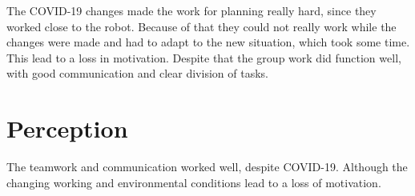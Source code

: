 \documentclass[main.tex]{subfiles}
\begin{document}
The COVID-19 changes made the work for planning really hard, since they worked close to the robot. Because of that they could not really work while the changes were made and had to adapt to the new situation, which took some time.
This lead to a loss in motivation. Despite that the group work did function well, with good communication and clear division of tasks.

\section{Perception}

The teamwork and communication worked well, despite COVID-19. Although the changing working and environmental conditions lead to a loss of motivation.


	
\end{document}
